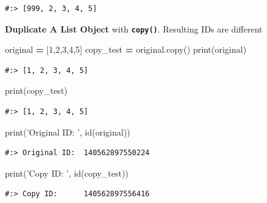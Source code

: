 \documentclass[
]{book}
\newenvironment{Shaded}{\begin{snugshade}}{\end{snugshade}}
\newcommand{\BuiltInTok}[1]{#1}
\newcommand{\DecValTok}[1]{\textcolor[rgb]{0.06,0.06,0.06}{#1}}
\newcommand{\NormalTok}[1]{#1}
\newcommand{\OperatorTok}[1]{\textcolor[rgb]{0.43,0.43,0.43}{\textbf{#1}}}
\newcommand{\StringTok}[1]{\textcolor[rgb]{0.5,0.5,0.5}{#1}}
\begin{document}
\begin{verbatim}
#:> [999, 2, 3, 4, 5]
\end{verbatim}

\textbf{Duplicate A List Object} with \textbf{\texttt{copy()}}. Resulting IDs are different

\begin{Shaded}
\begin{Highlighting}[]
\NormalTok{original }\OperatorTok{=}\NormalTok{ [}\DecValTok{1}\NormalTok{,}\DecValTok{2}\NormalTok{,}\DecValTok{3}\NormalTok{,}\DecValTok{4}\NormalTok{,}\DecValTok{5}\NormalTok{]}
\NormalTok{copy_test }\OperatorTok{=}\NormalTok{ original.copy()}
\BuiltInTok{print}\NormalTok{(original)}
\end{Highlighting}
\end{Shaded}

\begin{verbatim}
#:> [1, 2, 3, 4, 5]
\end{verbatim}

\begin{Shaded}
\begin{Highlighting}[]
\BuiltInTok{print}\NormalTok{(copy_test)}
\end{Highlighting}
\end{Shaded}

\begin{verbatim}
#:> [1, 2, 3, 4, 5]
\end{verbatim}

\begin{Shaded}
\begin{Highlighting}[]
\BuiltInTok{print}\NormalTok{(}\StringTok{'Original ID: '}\NormalTok{, }\BuiltInTok{id}\NormalTok{(original))}
\end{Highlighting}
\end{Shaded}

\begin{verbatim}
#:> Original ID:  140562897550224
\end{verbatim}

\begin{Shaded}
\begin{Highlighting}[]
\BuiltInTok{print}\NormalTok{(}\StringTok{'Copy ID:     '}\NormalTok{, }\BuiltInTok{id}\NormalTok{(copy_test))}
\end{Highlighting}
\end{Shaded}

\begin{verbatim}
#:> Copy ID:      140562897556416
\end{verbatim}
\end{document}
